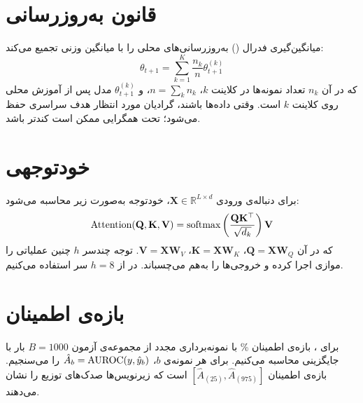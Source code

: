 \section{قانون به‌روزرسانی }

میانگین‌گیری فدرال () به‌روزرسانی‌های محلی را با میانگین وزنی تجمیع می‌کند:
\begin{equation}
\theta_{t+1} = \sum_{k=1}^{K} \frac{n_k}{n} \theta_{t+1}^{(k)}
\end{equation}
که در آن $n_k$ تعداد نمونه‌ها در کلاینت $k$، $n = \sum_k n_k$، و $\theta_{t+1}^{(k)}$ مدل پس از آموزش محلی روی کلاینت $k$ است. وقتی داده‌ها  باشند، گرادیان مورد انتظار هدف سراسری حفظ می‌شود؛ تحت  همگرایی ممکن است کندتر باشد.

\section{خودتوجهی}

برای دنباله‌ی ورودی $\mathbf{X} \in \mathbb{R}^{L \times d}$، خودتوجه به‌صورت زیر محاسبه می‌شود:
\begin{equation}
\text{Attention}(\mathbf{Q}, \mathbf{K}, \mathbf{V}) = \text{softmax}\left(\frac{\mathbf{Q}\mathbf{K}^\top}{\sqrt{d_k}}\right) \mathbf{V}
\end{equation}
که در آن $\mathbf{Q} = \mathbf{X}\mathbf{W}_Q$، $\mathbf{K} = \mathbf{X}\mathbf{W}_K$، $\mathbf{V} = \mathbf{X}\mathbf{W}_V$. توجه چندسر $h$ چنین عملیاتی را موازی اجرا کرده و خروجی‌ها را به‌هم می‌چسباند. در  از $h=8$ سر استفاده می‌کنیم.

\section{بازه‌ی اطمینان }

برای ، بازه‌ی اطمینان \% با نمونه‌برداری مجدد از مجموعه‌ی آزمون $B=1000$ بار با جایگزینی محاسبه می‌کنیم. برای هر نمونه‌ی  $b$، $\hat{A}_b = \text{AUROC}(y, \hat{y}_b)$ را می‌سنجیم. بازه‌ی اطمینان $[\hat{A}_{(25)}, \hat{A}_{(975)}]$ است که زیرنویس‌ها صدک‌های توزیع  را نشان می‌دهند.

